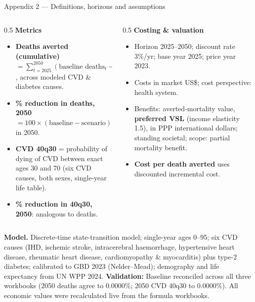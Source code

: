 \documentclass[
  ignorenonframetext,
  aspectratio=169]{beamer}
\begin{document}
\begin{frame}{Appendix 2 --- Definitions, horizons and assumptions}
\label{appendix-2-definitions-horizons-and-assumptions}
\footnotesize
\begin{columns}[T]
\begin{column}{0.5\textwidth}
\textbf{Metrics}
\begin{itemize}\scriptsize\itemsep2pt
  \item \textbf{Deaths averted (cumulative)} $=\sum_{t=2025}^{2050}(\text{baseline deaths}_t-\text{scenario deaths}_t)$, across modeled CVD \& diabetes causes.
  \item \textbf{\% reduction in deaths, 2050} $=100\times(\text{baseline}-\text{scenario})/\text{baseline}$ in 2050.
  \item \textbf{CVD 40q30} = probability of dying of CVD between exact ages 30 and 70 (six CVD causes, both sexes, single-year life table).
  \item \textbf{\% reduction in 40q30, 2050}: analogous to deaths.
\end{itemize}
\end{column}
\begin{column}{0.5\textwidth}
\textbf{Costing \& valuation}
\begin{itemize}\scriptsize\itemsep2pt
  \item Horizon 2025--2050; discount rate 3\%/yr; base year 2025; price year 2023.
  \item Costs in market US\$; cost perspective: health system.
  \item Benefits: averted-mortality value, \textbf{preferred VSL} (income elasticity 1.5), in PPP international dollars; standing societal; scope: partial mortality benefit.
  \item \textbf{Cost per death averted} uses discounted incremental cost.
\end{itemize}
\end{column}
\end{columns}

\vspace{3pt}

\scriptsize \textbf{Model.} Discrete-time state-transition model;
single-year ages 0--95; six CVD causes (IHD, ischemic stroke,
intracerebral haemorrhage, hypertensive heart disease, rheumatic heart
disease, cardiomyopathy \& myocarditis) plus type-2 diabetes; calibrated
to GBD 2023 (Nelder--Mead); demography and life expectancy from UN WPP
2024. \textbf{Validation:} Baseline reconciled across all three
workbooks (2050 deaths agree to 0.0000\%; 2050 CVD 40q30 to 0.0000\%).
All economic values were recalculated live from the formula workbooks.
\end{frame}
\end{document}
